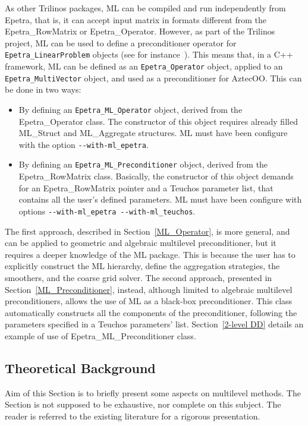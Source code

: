 As other Trilinos packages, ML can be compiled and run independently
from Epetra, that is, it can accept input matrix in formats different
from the Epetra\_RowMatrix or Epetra\_Operator. However, as part of the
Trilinos project, ML can be used to define a preconditioner operator for
\verb!Epetra_LinearProblem! objects (see for
instance~\cite{Epetra-Ref-Guide}). This means that, in a C++ framework,
ML can be defined as an \verb!Epetra_Operator! object, applied to an
\verb!Epetra_MultiVector!  object, and used as a preconditioner for
AztecOO.  This can be done in two ways:
\begin{itemize}
\item By defining an \verb!Epetra_ML_Operator! object, derived from the
  Epetra\_Operator class. The constructor of this object requires
  already filled ML\_Struct and ML\_Aggregate structures.  ML must have
  been configure with the option \verb!--with-ml_epetra!.
\item By defining an \verb!Epetra_ML_Preconditioner! object, derived
  from the Epetra\_RowMatrix class. Basically, the constructor of
  this object demands for an Epetra\_RowMatrix  pointer and a
  Teuchos parameter list, that contains all the user's defined
  parameters. ML must have been configure with options
  \verb!--with-ml_epetra --with-ml_teuchos!.
\end{itemize}

The first approach, described in Section~\ref{ML_Operator}, is more
general, and can be applied to geometric and algebraic multilevel
preconditioner, but it requires a deeper knowledge of the ML package.
This is because the user has to explicitly construct the ML hierarchy,
define the aggregation strategies, the smoothers, and the coarse grid
solver. The second approach, presented in
Section~\ref{ML_Preconditioner}, instead, although limited to algebraic
multilevel preconditioners, allows the use of ML as a black-box
preconditioner. This class automatically constructs all the components
of the preconditioner, following the parameters specified in a Teuchos
parameters' list. Section~\ref{2-level DD} details an example of use of
Epetra\_ML\_Preconditioner class.



\subsection{Theoretical Background}
\label{ml:theoretical}

Aim of this Section is to briefly present some aspects on multilevel
methods. The Section is not supposed to be exhaustive, nor complete on
this subject. The reader is referred to the existing literature for a
rigorous presentation.

